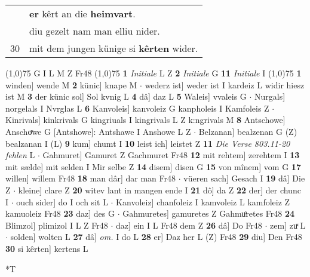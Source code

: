 \documentclass[8pt,a4paper,notitlepage]{article}
\begin{document}
\begin{table}[ht]
\begin{minipage}[t]{0.5\linewidth}
\begin{tabular}{rl}
 & \textbf{er} kêrt an die \textbf{heimvart}.\\ 
 & diu gezelt nam man elliu nider.\\ 
30 & mit dem jungen künige si \textbf{kêrten} wider.\\ 
\end{tabular}
\scriptsize
\line(1,0){75} \newline
G I L M Z Fr48 \newline
\line(1,0){75} \newline
\textbf{1} \textit{Initiale} L Z  \textbf{2} \textit{Initiale} G  \textbf{11} \textit{Initiale} I  \newline
\line(1,0){75} \newline
\textbf{1} winden] wende M \textbf{2} künic] knape M  $\cdot$ wederz ist] weder ist I kardeiz L widir hiesz ist M \textbf{3} der künic sol] Sol kvnig L \textbf{4} dâ] daz L \textbf{5} Waleis] vvaleis G  $\cdot$ Nurgals] norgelals I Nvrglas L \textbf{6} Kanvoleis] kanvoleiz G kanpholeis I Kamfoleis Z  $\cdot$ Kinrivals] kinkrivals G kingriuals I kingrivals L Z k:ngrivals M \textbf{8} Antschowe] Anschoͮwe G [Antshowe]: Antshawe I Anshowe L Z  $\cdot$ Belzanan] bealzenan G (Z) bealzanan I (L) \textbf{9} kum] chumt I \textbf{10} leist ich] leistet Z \textbf{11} \textit{Die Verse 803.11-20 fehlen} L   $\cdot$ Gahmuret] Gamuret Z Gachmuret Fr48 \textbf{12} mit rehtem] zerehtem I \textbf{13} mit sælde] mit selden I Mir selbe Z \textbf{14} disem] disen G \textbf{15} von mînem] vom G \textbf{17} willen] willem Fr48 \textbf{18} man dâr] dar man Fr48  $\cdot$ vüeren sach] Gesach I \textbf{19} dâ] Die Z  $\cdot$ kleine] clare Z \textbf{20} witev lant in mangen ende I \textbf{21} dô] da Z \textbf{22} der] der chunc I  $\cdot$ ouch sider] do I och sit L  $\cdot$ Kanvoleiz] chanfoleiz I kamvoleiz L kamfoleiz Z kamuoleiz Fr48 \textbf{23} daz] des G  $\cdot$ Gahmuretes] gamuretes Z Gahmuͦretes Fr48 \textbf{24} Blimzol] plimizol I L Z Fr48  $\cdot$ daz] ein I L Fr48 dem Z \textbf{26} dâ] Do Fr48  $\cdot$ zem] zuͯ L  $\cdot$ solden] wolten L \textbf{27} dâ] \textit{om.} I do L \textbf{28} er] Daz her L (Z) Fr48 \textbf{29} diu] Den Fr48 \textbf{30} si kêrten] kertens L \newline
\end{minipage}
\hspace{0.5cm}
\begin{minipage}[t]{0.5\linewidth}
\small
\begin{center}*T
\end{center}
\begin{tabular}{rl}

\end{tabular}
\end{minipage}
\end{table}
\end{document}
